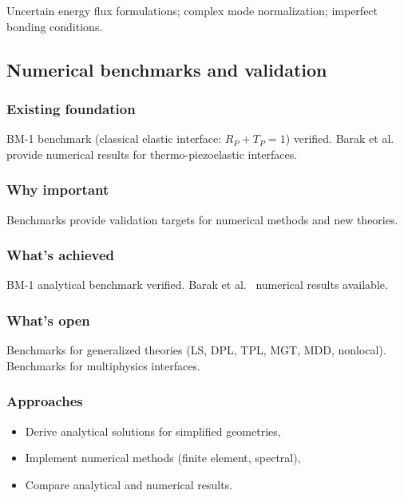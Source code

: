 Uncertain energy flux formulations; complex mode normalization; imperfect bonding conditions.

\subsection{Numerical benchmarks and validation}
\label{sec:15.3}

\subsubsection{Existing foundation}

BM-1 benchmark (classical elastic interface: $R_P + T_P = 1$) verified. Barak et al.~\cite{Barak2023} provide numerical results for thermo-piezoelastic interfaces.

\subsubsection{Why important}

Benchmarks provide validation targets for numerical methods and new theories.

\subsubsection{What's achieved}

BM-1 analytical benchmark verified. Barak et al.~\cite{Barak2023} numerical results available.

\subsubsection{What's open}

Benchmarks for generalized theories (LS, DPL, TPL, MGT, MDD, nonlocal). Benchmarks for multiphysics interfaces.

\subsubsection{Approaches}

\begin{itemize}
\item Derive analytical solutions for simplified geometries,
\item Implement numerical methods (finite element, spectral),
\item Compare analytical and numerical results.
\end{itemize}

